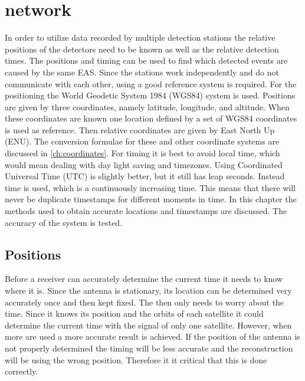 \chapter{\hisparc network}
\label{ch:cluster}

In order to utilize data recorded by multiple \hisparc detection stations the relative positions of the detectors need to be known as well as the relative detection times. The positions and timing can be used to find which detected events are caused by the same EAS. Since the stations work independently and do not communicate with each other, using a good reference system is required. For the positioning the World Geodetic System 1984 (WGS84) system is used. Positions are given by three coordinates, namely latitude, longitude, and altitude. When these coordinates are known one location defined by a set of WGS84 coordinates is used as reference. Then relative coordinates are given by East North Up (ENU). The conversion formulae for these and other coordinate systems are discussed in \cref{ch:coordinates}. For timing it is best to avoid local time, which would mean dealing with day light saving and timezones. Using Coordinated Universal Time (UTC) is slightly better, but it still has leap seconds. Instead \gps time is used, which is a continuously increasing time. This means that there will never be duplicate timestamps for different moments in time. In this chapter the methods used to obtain accurate \gps locations and timestamps are discussed. The accuracy of the \gps system is tested.


\section{Positions}

Before a \gps receiver can accurately determine the current time it needs to know where it is. Since the \gps antenna is stationary, its location can be determined very accurately once and then kept fixed. The \gps then only needs to worry about the time. Since it knows its position and the orbits of each \gps satellite it could determine the current time with the signal of only one \gps satellite. However, when more are used a more accurate result is achieved. If the position of the \gps antenna is not properly determined the timing will be less accurate and the reconstruction will be using the wrong position. Therefore it it critical that this is done correctly.


